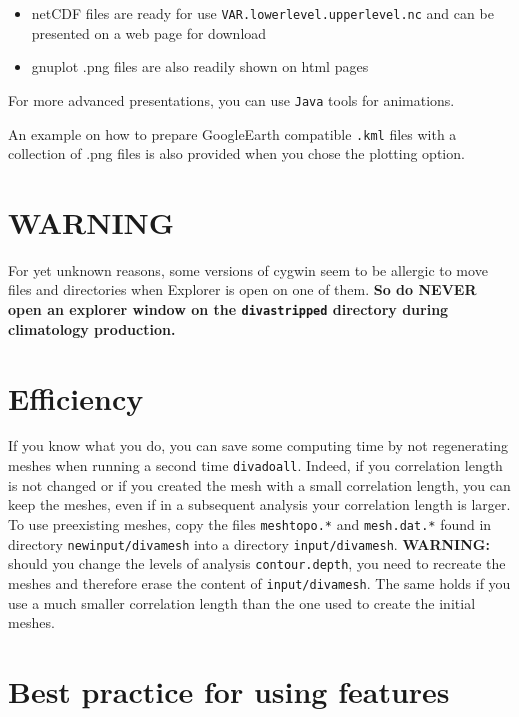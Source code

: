 \documentclass[8pt,a4paper,notitlepage]{book}
\begin{document}
\begin{itemize}
\item netCDF files are ready for use {\tt VAR.lowerlevel.upperlevel.nc} and can be presented on a web page for download
\item gnuplot .png files are also readily shown on html pages 
\end{itemize}

For more advanced presentations, you can use {\tt Java} tools for animations.

An example on how to prepare GoogleEarth compatible {\tt .kml} files with a collection of .png files is also provided when you chose the plotting option.


\section{WARNING}

For yet unknown reasons, some versions of cygwin seem to be allergic to move files and directories when Explorer is open on one of them. {\bf So do NEVER open an
explorer window on the {\tt divastripped} directory during climatology production.}


\section{Efficiency}

If you know what you do, you can save some computing time by not regenerating meshes when running a second time {\tt divadoall}. Indeed, if you correlation length
is not changed or if you created the mesh with a small correlation length, you can keep the meshes, even if in a subsequent analysis your correlation length is larger. To use preexisting meshes, copy the files {\tt  meshtopo.*} and {\tt mesh.dat.*} found in directory {\tt newinput/divamesh} into a directory {\tt input/divamesh}. {\bf WARNING: } should you change the levels of analysis {\tt contour.depth}, you need to recreate the meshes and therefore erase the content of 
{\tt input/divamesh}. The same holds if you use a much smaller correlation length than the one used to create the initial meshes.

\section{Best practice for using features}
\end{document}
